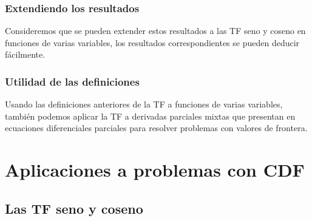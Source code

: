 \documentclass[12pt]{beamer}
\begin{document}
\begin{frame}
\frametitle{Extendiendo los resultados}
Consideremos que se pueden extender estos resultados a las TF seno y coseno en funciones de varias variables, los resultados correspondientes se pueden deducir fácilmente.
\end{frame}
\begin{frame}
\frametitle{Utilidad de las definiciones}
Usando las definiciones anteriores de la TF a funciones de varias variables, también podemos aplicar la TF a derivadas parciales mixtas que presentan en ecuaciones diferenciales parciales para resolver problemas con valores de frontera.
\end{frame}

\section{Aplicaciones a problemas con CDF}
\subsection{Las TF seno y coseno}
\end{document}
